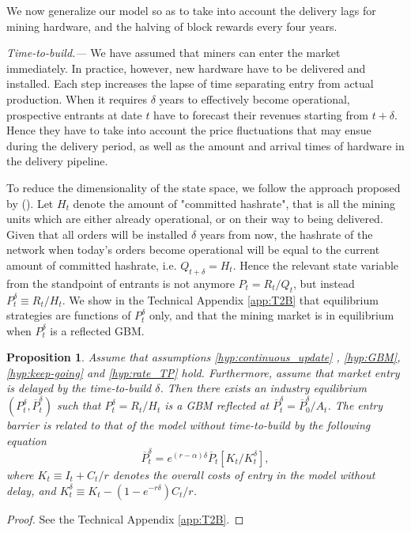 \documentclass[12pt, a4paper]{article}
\newtheorem{prop}{Proposition}
\begin{document}
We now generalize our model so as to take into account the delivery lags for mining hardware,
and the halving of block rewards every four years.

\emph{Time-to-build.---} We have assumed that miners can enter the market immediately.
In practice, however, new hardware have to be delivered and
installed. Each step increases the lapse of time separating entry from actual production.
When it requires $\delta$ years to effectively become operational, prospective entrants at date $t$ have to forecast
their revenues starting from $t+\delta$. Hence they have to
take into account the price fluctuations that may ensue during the delivery period,
as well as the amount and arrival times of hardware in the delivery pipeline.

To reduce the dimensionality of the state space, we follow the approach proposed by \citeauthor{Grenadier2000} (\citeyear{Grenadier2000}).
Let $H_t$ denote the amount of "committed hashrate", that is all the mining units which are either
already operational, or on their way to being delivered. Given that all orders
will be installed $\delta$ years from now, the hashrate of the network when today's
orders become operational will be equal to the current amount of committed hashrate, i.e. $Q_{t+\delta}=H_t$.
Hence the relevant state variable from the standpoint of entrants is not anymore $P_t=R_t/Q_t$,
but instead $P^{\delta}_t \equiv R_t/H_t$. We show in the Technical Appendix \ref{app:T2B} that equilibrium
strategies are functions of $P^{\delta}_t$ only, and that the mining market
is in equilibrium when $P^{\delta}_t$ is a reflected GBM.

\begin{prop}
\label{prop:industry-eq-T2B} Assume that assumptions \ref{hyp:continuous_update}%
, \ref{hyp:GBM}, \ref{hyp:keep-going} and \ref{hyp:rate_TP} hold. Furthermore, assume
that market entry is delayed by the time-to-build $\delta$. Then there
exists an industry equilibrium $\left(P^{\delta}_t,\overline{P}^{\delta}_t\right)$ such that $P^{\delta}_t = R_t/H_t$
is a GBM reflected at $\overline{P}^{\delta}_t=\overline{P}^{\delta}_0/A_t$. The entry barrier
is related to that of the model without time-to-build by the following equation
\begin{equation}
\overline{P}^{\delta}_t=e^{\left(r-\alpha\right)\delta}\overline{P}_t\left[K_t/K_t^{\delta}\right],  \label{eq:def_barrier_T2B}
\end{equation}
where $K_t\equiv I_{t}+C_t/r$ denotes the overall costs of entry in the model without delay, and $K_t^{\delta} \equiv K_t-(1-e^{-r\delta})C_t/r$.
\end{prop}
\begin{proof}
  See the Technical Appendix \ref{app:T2B}.
\end{proof}
\end{document}
